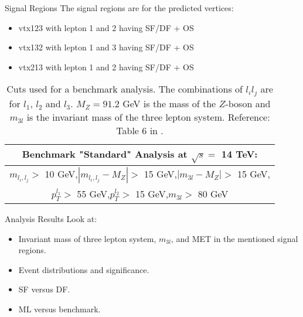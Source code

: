 \documentclass[notes]{beamer}
\begin{document}
	\begin{frame}[t]{Signal Regions}
		The signal regions are for the predicted vertices:
		\begin{itemize}
			\item vtx123 with lepton 1 and 2 having SF/DF + OS
			\item vtx132 with lepton 1 and 3 having SF/DF + OS
			\item vtx213 with lepton 1 and 2 having SF/DF + OS
		\end{itemize}
	
		\begin{table}[ht!]
			\centering
			\begin{tabular}{|c|}
				\hline \rule{0pt}{13pt}
				\textbf{Benchmark "Standard" Analysis at $\sqrt{s}=$ 14 TeV:}\\
				\hline \rule{0pt}{13pt}
				$m_{l_i,l_j}>$ 10 GeV,\quad $|m_{l_i,l_j}-M_Z|>$ 15 GeV,\quad $|m_{3l}-M_Z|>$ 15 GeV,\\
				$p_T^{l_1}>$ 55 GeV,\quad $p_T^{l_2}>$ 15 GeV,\quad $m_{3l}>$ 80 GeV\\
				\hline
			\end{tabular}
			\caption{Cuts used for a benchmark analysis. The combinations of $l_il_j$ are for $l_1$, $l_2$ and $l_3$. $M_Z=91.2$ GeV is the mass of the $Z$-boson and $m_{3l}$ is the invariant mass of the three lepton system. Reference: Table 6 in \citet{inverseseesaw}.}
			\label{tab:Cuts_Benchmark}
		\end{table}
	\end{frame}


	\begin{frame}[t]{Analysis Results}
		Look at:
		\begin{itemize}
			\item Invariant mass of three lepton system, $m_{3l}$, and MET in the mentioned signal regions.
			\item Event distributions and significance.
			\item SF versus DF.
			\item ML versus benchmark.
		\end{itemize}
	\end{frame}
\end{document}
